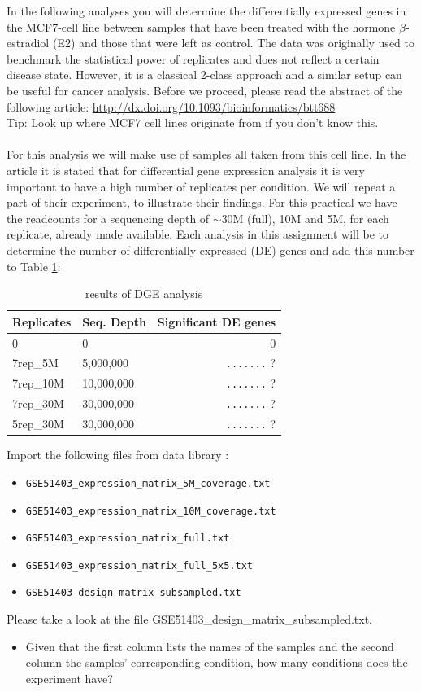 In the following analyses you will determine the differentially expressed genes in the MCF7-cell line between samples that have been treated with the hormone $\beta$-estradiol (E2) and those that were left as control. The data was originally used to benchmark the statistical power of replicates and does not reflect a certain disease state. However, it is a classical 2-class approach and a similar setup can be useful for cancer analysis. Before we proceed, please read the abstract of the following article:
\url{http://dx.doi.org/10.1093/bioinformatics/btt688}\\
Tip: Look up where MCF7 cell lines originate from if you don't know this.\\
\\
For this analysis we will make use of samples all taken from this cell line.
In the article it is stated that for differential gene expression analysis it is very important to have a high number of replicates per condition.
We will repeat a part of their experiment, to illustrate their findings. For this practical we have the readcounts for a sequencing depth of $\sim$30M (full), 10M and 5M, for each replicate, already made available.
Each analysis in this assignment will be to determine the number of differentially expressed (DE) genes and add this number to Table \ref{tab:dge_ad_01}:
\begin{table}[]
\centering
\caption{results of DGE analysis}
\label{tab:dge_ad_01}
\begin{tabular}{ | l | l | r | }
\hline
Replicates & Seq. Depth & Significant DE genes \\
\hline
0          & 0          & 0\quad\quad \\
7rep\_5M   & 5,000,000  & \verb|.......| ? \\
7rep\_10M  & 10,000,000 & \verb|.......| ? \\
7rep\_30M  & 30,000,000 & \verb|.......| ? \\
5rep\_30M  & 30,000,000 & \verb|.......| ? \\
\hline
\end{tabular}
\end{table}
Import the following files from data library \datalibrarydirrnaseqadvanced :
\begin{itemize}
	\item[] \verb|GSE51403_expression_matrix_5M_coverage.txt|
	\item[] \verb|GSE51403_expression_matrix_10M_coverage.txt|
	\item[] \verb|GSE51403_expression_matrix_full.txt|
	\item[] \verb|GSE51403_expression_matrix_full_5x5.txt|
	\item[] \verb|GSE51403_design_matrix_subsampled.txt|
\end{itemize}
Please take a look at the file GSE51403\_design\_matrix\_subsampled.txt.
\begin{itemize}
	\item Given that the first column lists the names of the samples and the second column the samples' corresponding condition, how many conditions does the experiment have?
\end{itemize}
